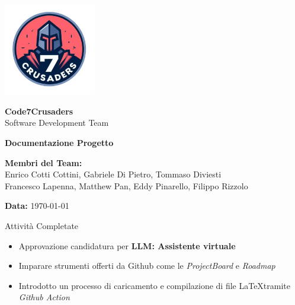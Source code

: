 \documentclass{beamer}
\begin{document}
\begin{frame}[plain] %
    \centering
    \vspace*{2cm}
    
    \includegraphics[width=0.3\textwidth]{../img/logo/7Crusaders_logo.png} %
    \vspace{1cm}
    
    {\Huge \textbf{Code7Crusaders}}\\
    \vspace{0.5cm}
    {\Large Software Development Team}\\
    \vspace{2cm}
    
    {\large \textbf{Documentazione Progetto}}\\
    \vspace{3cm}

    \textbf{Membri del Team:}\\
    Enrico Cotti Cottini, Gabriele Di Pietro, Tommaso Diviesti \\
    Francesco Lapenna, Matthew Pan, Eddy Pinarello, Filippo Rizzolo \\
    \vspace{1cm}
    
    {\large \textbf{Data:}} \today\\
    
    \vspace{1cm}
\end{frame}

\begin{frame}
    \begin{exampleblock}{Attività Completate}
        \begin{itemize}
            \item Approvazione candidatura per \textbf{LLM: Assistente virtuale}
            \item Imparare strumenti offerti da Github come le \emph{ProjectBoard} e \emph{Roadmap}
            \item Introdotto un processo di caricamento e compilazione di file \LaTeX tramite \emph{Github Action}
        \end{itemize}
    \end{exampleblock}
\end{frame}
\end{document}
